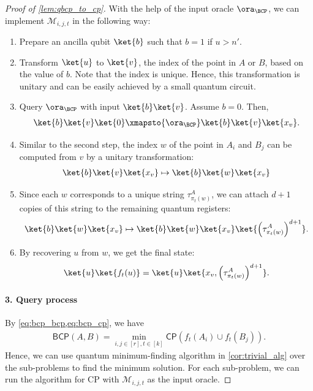 \begin{proof}[Proof of \cref{lem:qbcp_to_cp}]
With the help of the input oracle $\ora_{\BCP}$, we can implement $\mathcal{M}_{i,j,t}$ in the following way: 
\begin{enumerate}
    \item Prepare an ancilla qubit $\ket{b}$ such that $b=1$ if $u>n'$. 
    \item Transform $\ket{u}$ to $\ket{v}$, the index of the point in $A$ or $B$, based on the value of $b$. Note that the index is unique. Hence, this transformation is unitary and can be easily achieved by a small quantum circuit.
    \item Query $\ora_{\BCP}$ with input $\ket{b}\ket{v}$. Assume $b=0$. Then, 
    \begin{align}
        \ket{b}\ket{v}\ket{0}\xmapsto{\ora_{\BCP}}\ket{b}\ket{v}\ket{x_v}.
    \end{align}
    \item Similar to the second step, the index $w$ of the point in $A_i$ and $B_j$ can be computed from $v$ by a unitary transformation:
    \begin{align}
        \ket{b}\ket{v}\ket{x_v}\mapsto \ket{b}\ket{w}\ket{x_v}
    \end{align}
    \item Since each $w$ corresponds to a unique string $\tau^A_{\pi_t(w)}$, we can attach $d+1$ copies of this string to the remaining quantum registers:
    \begin{align}
        \ket{b}\ket{w}\ket{x_v}\mapsto \ket{b}\ket{w}\ket{x_v}\ket{\left( \tau^A_{\pi_t(w)} \right)^{d+1}}.
    \end{align}
    \item By recovering $u$ from $w$, we get the final state:
    \begin{align}
        \ket{u}\ket{f_t(u)}=\ket{u}\ket{x_v,\left( \tau^A_{\pi_t(w)} \right)^{d+1}}.
    \end{align}
\end{enumerate}

\paragraph*{3. Query process}
By \cref{eq:bcp_bcp,eq:bcp_cp}, we have
\begin{align}\label{eq:bcp_all}
    \textsf{BCP}(A,B)=\min_{i,j\in [r],t\in [k]}\textsf{CP}(f_t(A_i)\cup f_t(B_j)).
\end{align}
Hence, we can use quantum minimum-finding algorithm in \cref{cor:trivial_alg} over the sub-problems to find the minimum solution. For each sub-problem, we can run the algorithm for \textsf{CP} with $\mathcal{M}_{i,j,t}$ as the input oracle.


\end{proof}
